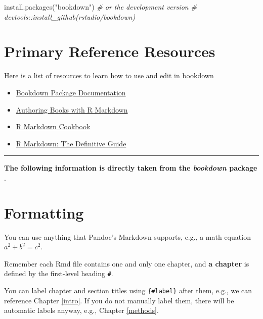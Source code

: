 \documentclass[
]{book}
\newenvironment{Shaded}{\begin{snugshade}}{\end{snugshade}}
\newcommand{\CommentTok}[1]{\textcolor[rgb]{0.56,0.35,0.01}{\textit{#1}}}
\newcommand{\FunctionTok}[1]{\textcolor[rgb]{0.00,0.00,0.00}{#1}}
\newcommand{\NormalTok}[1]{#1}
\newcommand{\StringTok}[1]{\textcolor[rgb]{0.31,0.60,0.02}{#1}}
\providecommand{\tightlist}{%
  \setlength{\itemsep}{0pt}\setlength{\parskip}{0pt}}
\begin{document}
\begin{Shaded}
\begin{Highlighting}[]
\FunctionTok{install.packages}\NormalTok{(}\StringTok{"bookdown"}\NormalTok{)}
\CommentTok{\# or the development version}
\CommentTok{\# devtools::install\_github(\textquotesingle{}rstudio/bookdown\textquotesingle{})}
\end{Highlighting}
\end{Shaded}

\hypertarget{primary-reference-resources}{%
\section{Primary Reference Resources}\label{primary-reference-resources}}

Here is a list of resources to learn how to use and edit in bookdown

\begin{itemize}
\tightlist
\item
  \href{https://bookdown.org/}{Bookdown Package Documentation}
\item
  \href{https://bookdown.org/yihui/bookdown/}{Authoring Books with R Markdown}
\item
  \href{https://bookdown.org/yihui/rmarkdown-cookbook/}{R Markdown Cookbook}
\item
  \href{https://bookdown.org/yihui/rmarkdown/}{R Markdown: The Definitive Guide}
\end{itemize}

\begin{center}\rule{0.5\linewidth}{0.5pt}\end{center}

\textbf{The following information is directly taken from the \emph{bookdown} package} \citep{R-bookdown}.

\hypertarget{formatting}{%
\section{Formatting}\label{formatting}}

You can use anything that Pandoc's Markdown supports, e.g., a math equation \(a^2 + b^2 = c^2\).

Remember each Rmd file contains one and only one chapter, and \textbf{a chapter} is defined by the first-level heading \texttt{\#}.

You can label chapter and section titles using \texttt{\{\#label\}} after them, e.g., we can reference Chapter \ref{intro}. If you do not manually label them, there will be automatic labels anyway, e.g., Chapter \ref{methods}.
\end{document}

